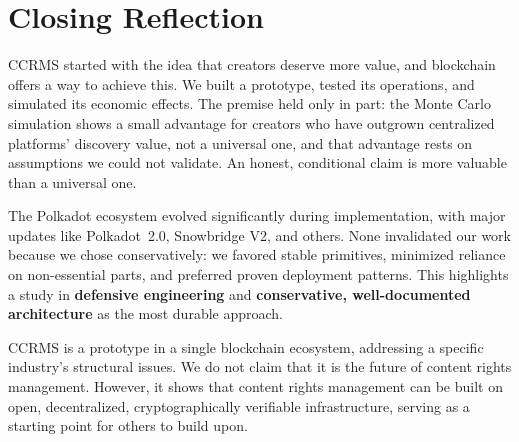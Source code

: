 \section{Closing Reflection}\label{sec:closing-reflection}

CCRMS started with the idea that creators deserve more value, and blockchain offers a way to achieve this. We built a prototype, tested its operations, and simulated its economic effects. The premise held only in part: the Monte Carlo simulation shows a small advantage for creators who have outgrown centralized platforms' discovery value, not a universal one, and that advantage rests on assumptions we could not validate. An honest, conditional claim is more valuable than a universal one.

The Polkadot ecosystem evolved significantly during implementation, with major updates like Polkadot~2.0, Snowbridge V2, and others. None invalidated our work because we chose conservatively: we favored stable primitives, minimized reliance on non-essential parts, and preferred proven deployment patterns. This highlights a study in \textbf{defensive engineering} and \textbf{conservative, well-documented architecture} as the most durable approach.

CCRMS is a prototype in a single blockchain ecosystem, addressing a specific industry's structural issues. We do not claim that it is the future of content rights management. However, it shows that content rights management can be built on open, decentralized, cryptographically verifiable infrastructure, serving as a starting point for others to build upon.
